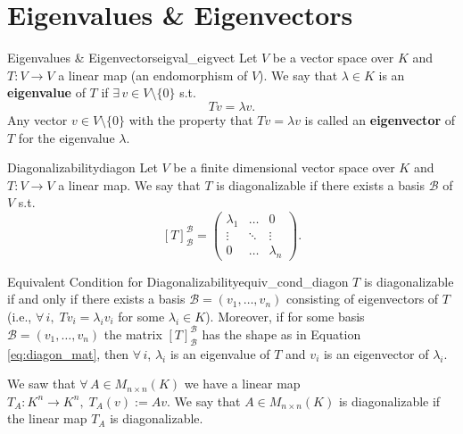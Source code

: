 % 
%
%
%

\section{Eigenvalues \& Eigenvectors}
\begin{definition}{Eigenvalues \& Eigenvectors}{eigval_eigvect}
	Let $V$ be a vector space over $K$ and $T:V \to V$ a linear map (an endomorphism of $V$). We say that $\lambda \in K$ is an \textbf{eigenvalue} of $T$ if $\exists\, v \in V \setminus \{0\}$ s.t. 
	\[
		Tv = \lambda v.
	\]
	Any vector $v \in V\setminus \{0\}$ with the property that $Tv = \lambda v$ is called an \textbf{eigenvector} of $T$ for the eigenvalue $\lambda$.
\end{definition}

\begin{definition}{Diagonalizability}{diagon}
	Let $V$ be a finite dimensional vector space over $K$ and $T:V \to V$ a linear map. We say that $T$ is diagonalizable if there exists a basis $\mathcal{B}$ of $V$ s.t.
	\begin{equation}
		\label{eq:diagon_mat}
		[T]^{\mathcal{B}}_{\mathcal{B}} = \begin{pmatrix}
			\lambda_1 & \hdots & 0\\
			\vdots & \ddots & \vdots\\
			0 & \hdots & \lambda_n
		\end{pmatrix}.
	\end{equation}
\end{definition}

\begin{lemma}{Equivalent Condition for Diagonalizability}{equiv_cond_diagon}
	$T$ is diagonalizable if and only if there exists a basis $\mathcal{B} = (v_1, \hdots , v_n)$ consisting of eigenvectors of $T$ (i.e., $\forall \, i, \; Tv_i = \lambda_i v_i$ for some $\lambda_i \in K$). Moreover, if for some basis $\mathcal{B} = (v_1, \hdots , v_n)$ the matrix $[T]^{\mathcal{B}}_{\mathcal{B}}$ has the shape as in Equation \eqref{eq:diagon_mat}, then $\forall \, i$, $\lambda_i$ is an eigenvalue of $T$ and $v_i$ is an eigenvector of $\lambda_i$.
\end{lemma}

\begin{remark}
	We saw that $\forall \, A\in M_{n\times n}(K)$ we have a linear map $T_A:K^n \to K^n, \; T_A(v) := Av$. We say that $A \in M_{n\times n}(K)$ is diagonalizable if the linear map $T_A$ is diagonalizable.
\end{remark}

